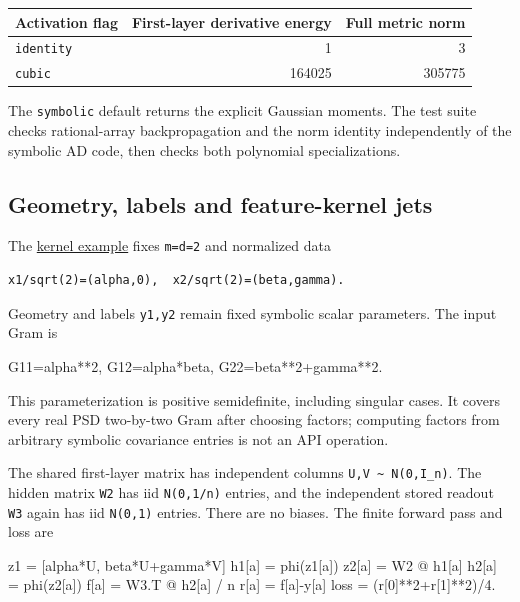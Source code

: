 \documentclass[
  11pt,
]{article}
\newenvironment{Shaded}{\begin{snugshade}}{\end{snugshade}}
\newcommand{\NormalTok}[1]{\textcolor[rgb]{0.00,0.23,0.31}{#1}}
\newcounter{none} %
\theoremstyle{definition}
\theoremstyle{plain}
\theoremstyle{plain}
\theoremstyle{plain}
\theoremstyle{remark}
\begin{document}
{\def\LTcaptype{none} %
\begin{longtable}[]{@{}lrr@{}}
\toprule\noalign{}
Activation flag & First-layer derivative energy & Full metric norm \\
\midrule\noalign{}
\endhead
\bottomrule\noalign{}
\endlastfoot
\texttt{identity} & 1 & 3 \\
\texttt{cubic} & 164025 & 305775 \\
\end{longtable}
}

The \texttt{symbolic} default returns the explicit Gaussian moments. The
test suite checks rational-array backpropagation and the norm identity
independently of the symbolic AD code, then checks both polynomial
specializations.

\subsection{Geometry, labels and feature-kernel
jets}\label{geometry-labels-and-feature-kernel-jets}

The \href{code/scripts/example_mfp_kernel_jets.py}{kernel example} fixes
\texttt{m=d=2} and normalized data
\begin{verbatim}
x1/sqrt(2)=(alpha,0),  x2/sqrt(2)=(beta,gamma).
\end{verbatim}
Geometry and labels \texttt{y1,y2}
remain fixed symbolic scalar parameters. The input Gram is

\begin{Shaded}
\begin{Highlighting}[]
\NormalTok{G11=alpha**2,  G12=alpha*beta,  G22=beta**2+gamma**2.}
\end{Highlighting}
\end{Shaded}

This parameterization is positive semidefinite, including singular
cases. It covers every real PSD two-by-two Gram after choosing factors;
computing factors from arbitrary symbolic covariance entries is not an
API operation.

The shared first-layer matrix has independent columns
\texttt{U,V\ \textasciitilde{}\ N(0,I\_n)}. The hidden matrix
\texttt{W2} has iid \texttt{N(0,1/n)} entries, and the independent
stored readout \texttt{W3} again has iid \texttt{N(0,1)} entries. There
are no biases. The finite forward pass and loss are

\begin{Shaded}
\begin{Highlighting}[]
\NormalTok{z1 = [alpha*U, beta*U+gamma*V]}
\NormalTok{h1[a] = phi(z1[a])}
\NormalTok{z2[a] = W2 @ h1[a]}
\NormalTok{h2[a] = phi(z2[a])}
\NormalTok{f[a] = W3.T @ h2[a] / n}
\NormalTok{r[a] = f[a]{-}y[a]}
\NormalTok{loss = (r[0]**2+r[1]**2)/4.}
\end{Highlighting}
\end{Shaded}
\end{document}
